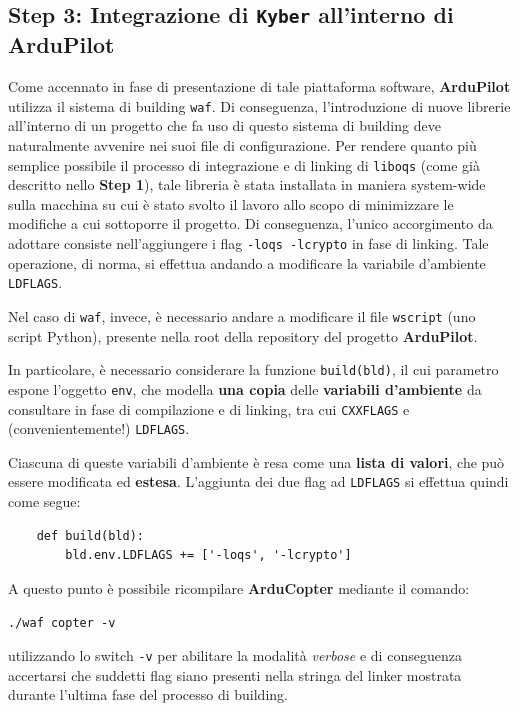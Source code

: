 \documentclass[a4paper, 12pt, oneside]{article}
\theoremstyle{definition}
\begin{document}
\subsection{Step 3: Integrazione di \texttt{Kyber} all'interno di ArduPilot}
Come accennato in fase di presentazione di tale piattaforma software, \textbf{ArduPilot} utilizza il sistema di building \texttt{waf}. Di conseguenza, l'introduzione di nuove librerie all'interno di un progetto che fa uso di questo sistema di building deve naturalmente avvenire nei suoi file di configurazione. Per rendere quanto più semplice possibile il processo di integrazione e di linking di \texttt{liboqs} (come già descritto nello \textbf{Step 1}), tale libreria è stata installata in maniera system-wide sulla macchina su cui è stato svolto il lavoro allo scopo di minimizzare le modifiche a cui sottoporre il progetto. Di conseguenza, l'unico accorgimento da adottare consiste nell'aggiungere i flag \texttt{-loqs -lcrypto} in fase di linking. Tale operazione, di norma, si effettua andando a modificare la variabile d'ambiente \texttt{LDFLAGS}.

Nel caso di \texttt{waf}, invece, è necessario andare a modificare il file \texttt{wscript} (uno script Python), presente nella root della repository del progetto \textbf{ArduPilot}.

In particolare, è necessario considerare la funzione \texttt{build(bld)}, il cui parametro espone l'oggetto \texttt{env}, che modella \textbf{una copia} delle \textbf{variabili d'ambiente} da consultare in fase di compilazione e di linking, tra cui \texttt{CXXFLAGS} e (convenientemente!) \texttt{LDFLAGS}.

Ciascuna di queste variabili d'ambiente è resa come una \textbf{lista di valori}, che può essere modificata ed \textbf{estesa}. L'aggiunta dei due flag ad \texttt{LDFLAGS} si effettua quindi come segue:

\begin{verbatim}
    def build(bld):
        bld.env.LDFLAGS += ['-loqs', '-lcrypto']
\end{verbatim}

A questo punto è possibile ricompilare \textbf{ArduCopter} mediante il comando:

\begin{center}
    \texttt{./waf copter -v}
\end{center}

utilizzando lo switch \texttt{-v} per abilitare la modalità \textit{verbose} e di conseguenza accertarsi che suddetti flag siano presenti nella stringa del linker mostrata durante l'ultima fase del processo di building.

\newpage
\printbibliography[title={Riferimenti bibliografici e risorse consultate}]
\end{document}
